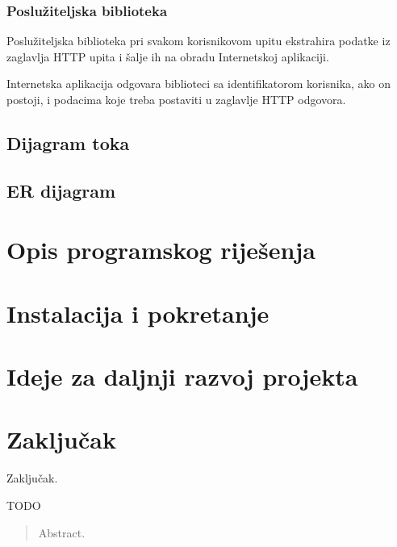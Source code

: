 \documentclass[times, utf8, zavrsni]{fer}
\begin{document}
\subsection{Poslužiteljska biblioteka}
Poslužiteljska biblioteka pri svakom korisnikovom upitu ekstrahira podatke iz
zaglavlja HTTP upita i šalje ih na obradu Internetskoj aplikaciji.

Internetska aplikacija odgovara biblioteci sa identifikatorom korisnika, ako
on postoji, i podacima koje treba postaviti u zaglavlje HTTP odgovora.

\section{Dijagram toka}
\section{ER dijagram}

\chapter{Opis programskog riješenja}

\chapter{Instalacija i pokretanje}

\chapter{Ideje za daljnji razvoj projekta}

\chapter{Zaključak}
Zaključak.




\begin{sazetak}
TODO

\end{sazetak}

\begin{abstract}
Abstract.

\end{abstract}
\end{document}
